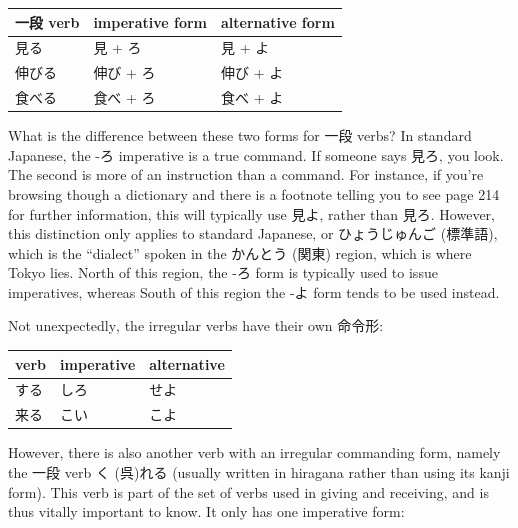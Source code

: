 \documentclass[11pt, b5paper, twoside, openright, onecolumn]{book}
\makeatletter
\newcommand*{\rubystack}[2]{{\relscale{0.5}%
  \begin{tabular}[b]{@{}c@{}}%
    {#1}\\%
   {\textscale{2}{#2}}%
  \end{tabular}}%
}
\DeclareRobustCommand*{\ruby}[2]{%
  \mbox{%
    \setlength{\parskip}{0ex}%
    \BeginAccSupp{method=pdfstringdef,ActualText={#1}}%
      \rubystack{\phantom{#2}}{#1}%
      \llap{%
        \rubystack{#2}{\phantom{#1}}%
      }%
    \EndAccSupp{}%
  }%
}
\renewcommand*{\ruby}[2]{#2 (#1)}%
\newenvironment{mytabular}[1]{\noindent\hspace{0.4in}
\begin{tabular}[h]{#1}}{\end{tabular}}
\makeatother
\begin{document}
\vspace{0.5cm}
\smaller
\begin{mytabular}{| l  l  l |}\hline 
\rule{0pt}{2.4ex}一段 verb & imperative form & alternative form\\ 
\hline
\rule{0pt}{2.4ex}見る & 見 + ろ  & 見 + よ\\ 
\rule{0pt}{2.4ex}伸びる & 伸び + ろ & 伸び + よ\\ 
\rule{0pt}{2.4ex}食べる & 食べ + ろ & 食べ + よ\\ 
\hline 
\end{mytabular}
\larger
\vspace{0.5cm}


What is the difference between these two forms for 一段 verbs? In standard Japanese‚ the -ろ imperative is a true command. If someone says 見ろ‚ you look. The second is more of an instruction than a command. For instance‚ if you’re browsing though a dictionary and there is a footnote telling you to see page 214 for further information‚ this will typically use 見よ‚ rather than 見ろ. However‚ this distinction only applies to standard Japanese‚ or \ruby{標準語}{ひょうじゅんご}‚ which is the “dialect” spoken in the \ruby{関東}{かんとう} region‚ which is where Tokyo lies. North of this region‚ the -ろ form is typically used to issue imperatives‚ whereas South of this region the -よ form tends to be used instead.

Not unexpectedly‚ the irregular verbs have their own 命令形:

\vspace{0.5cm}
\smaller
\begin{mytabular}{| l  l  l |}\hline 
\rule{0pt}{2.4ex}verb & imperative & alternative\\ 
\hline
\rule{0pt}{2.4ex}する & \index[japanese]{しろ}しろ & \index[japanese]{せよ}せよ\\ 
\rule{0pt}{2.4ex}来る & \index[japanese]{こい}こい & \index[japanese]{こよ}こよ\\ 
\hline 
\end{mytabular}
\larger
\vspace{0.5cm}


However‚ there is also another verb with an irregular commanding form‚ namely the 一段 verb \ruby{呉}{く}れる (usually written in hiragana rather than using its kanji form). This verb is part of the set of verbs used in giving and receiving‚ and is thus vitally important to know. It only has one imperative form:
\end{document}
